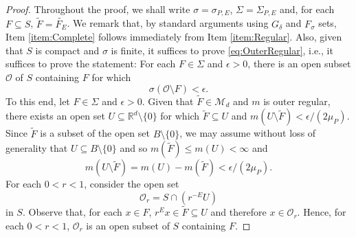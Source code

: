 \documentclass[11pt, letter]{book}
\begin{document}
\begin{proof}
Throughout the proof, we shall write $\sigma=\sigma_{P,E}$, $\Sigma=\Sigma_{P,E}$ and, for each $F\subseteq S$, $\widetilde{F}=\widetilde{F_E}$. We remark that, by standard arguments using $G_\delta$ and $F_\sigma$ sets, Item \ref{item:Complete} follows immediately from Item \ref{item:Regular}. Also, given that $S$ is compact and $\sigma$ is finite, it suffices to prove \eqref{eq:OuterRegular}, i.e., it suffices to prove the statement: For each $F\in \Sigma$ and $\epsilon>0$, there is an open subset $\mathcal{O}$ of $S$ containing $F$ for which 
\begin{equation*}
\sigma(\mathcal{O}\setminus F)<\epsilon.
\end{equation*}
To this end, let $F\in \Sigma$ and $\epsilon>0$. Given that $\widetilde{F}\in\mathcal{M}_d$ and $m$ is outer regular, there exists an open set $U\subseteq \mathbb{R}^d\setminus\{0\}$ for which $\widetilde{F}\subseteq U$ and $m(U\setminus\widetilde{F})<\epsilon/(2\mu_P)$. Since $\widetilde{F}$ is a subset of the open set $B\setminus\{0\}$, we may assume without loss of generality that $U\subseteq B\setminus\{0\}$ and so $m(\widetilde{F})\leq m(U)<\infty$ and
\begin{equation}\label{eq:LebesgueOuter}
m(U\setminus \widetilde{F})=m(U)-m(\widetilde{F})<\epsilon/(2\mu_P).
\end{equation}
For each $0<r<1$, consider the open set
\begin{equation*}
\mathcal{O}_r=S\cap\left( r^{-E}U\right)
\end{equation*}
in $S$. Observe that, for each $x\in F$, $r^E x\in \widetilde{F}\subseteq U$ and therefore $x\in \mathcal{O}_r$. Hence, for each $0<r<1$, $\mathcal{O}_r$ is an open subset of $S$ containing $F$. 


\end{proof}
\end{document}
